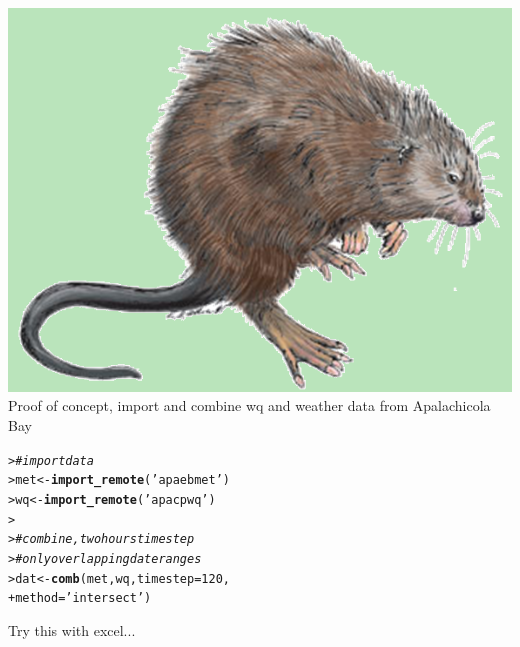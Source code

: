 \documentclass[serif]{beamer}\usepackage[]{graphicx}\usepackage[]{color}
\makeatletter
\newcommand{\hlnum}[1]{\textcolor[rgb]{0.686,0.059,0.569}{#1}}%
\newcommand{\hlstr}[1]{\textcolor[rgb]{0.192,0.494,0.8}{#1}}%
\newcommand{\hlcom}[1]{\textcolor[rgb]{0.678,0.584,0.686}{\textit{#1}}}%
\newcommand{\hlstd}[1]{\textcolor[rgb]{0.345,0.345,0.345}{#1}}%
\newcommand{\hlkwb}[1]{\textcolor[rgb]{0.69,0.353,0.396}{#1}}%
\newcommand{\hlkwc}[1]{\textcolor[rgb]{0.333,0.667,0.333}{#1}}%
\newcommand{\hlkwd}[1]{\textcolor[rgb]{0.737,0.353,0.396}{\textbf{#1}}}%
\newenvironment{kframe}{%
 \def\at@end@of@kframe{}%
 \ifinner\ifhmode%
  \def\at@end@of@kframe{\end{minipage}}%
  \begin{minipage}{\columnwidth}%
 \fi\fi%
 \def\FrameCommand##1{\hskip\@totalleftmargin \hskip-\fboxsep
 \colorbox{shadecolor}{##1}\hskip-\fboxsep
     \hskip-\linewidth \hskip-\@totalleftmargin \hskip\columnwidth}%
 \MakeFramed {\advance\hsize-\width
   \@totalleftmargin\z@ \linewidth\hsize
   \@setminipage}}%
 {\par\unskip\endMakeFramed%
 \at@end@of@kframe}
\newenvironment{knitrout}{}{} %
\makeatother
\begin{document}
\begin{frame}[fragile]{\includegraphics[width=0.05\paperwidth]{fig/muskrat.png}\hspace{0.07in}{\bf SWMPrats.net: The SWMPr package}}
Proof of concept, import and combine wq and weather data from Apalachicola Bay
\begin{knitrout}
\color{fgcolor}\begin{kframe}
\begin{alltt}
\hlstd{> }\hlcom{# import data}
\hlstd{> }\hlstd{met} \hlkwb{<-} \hlkwd{import_remote}\hlstd{(}\hlstr{'apaebmet'}\hlstd{)}
\hlstd{> }\hlstd{wq} \hlkwb{<-} \hlkwd{import_remote}\hlstd{(}\hlstr{'apacpwq'}\hlstd{)}
\hlstd{> }
\hlstd{> }\hlcom{# combine, two hours time step}
\hlstd{> }\hlcom{# only overlapping date ranges}
\hlstd{> }\hlstd{dat} \hlkwb{<-} \hlkwd{comb}\hlstd{(met, wq,} \hlkwc{timestep} \hlstd{=} \hlnum{120}\hlstd{,}
\hlstd{+ }  \hlkwc{method} \hlstd{=} \hlstr{'intersect'}\hlstd{)}
\end{alltt}
\end{kframe}
\end{knitrout}
Try this with excel...
\end{frame}
\end{document}
